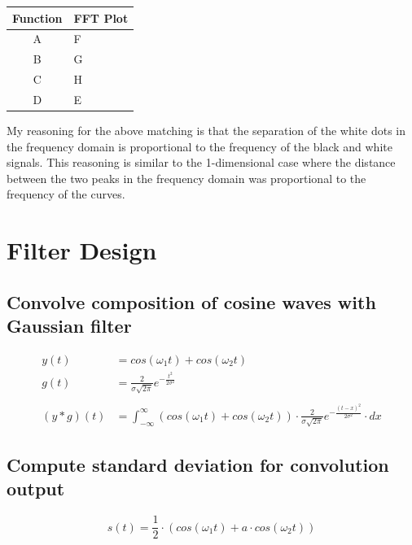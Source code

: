 \documentclass[12pt, oneside]{article}
\begin{document}
\begin{table}[H]
    \centering
    \begin{tabular}{|c|l|}
    \hline
    \multicolumn{1}{|l|}{\textbf{Function}} & \textbf{FFT Plot} \\ \hline
    A                                       & F                 \\ \hline
    B                                       & G                 \\ \hline
    C                                       & H                 \\ \hline
    D                                       & E                 \\ \hline
    \end{tabular}
\end{table}

My reasoning  for the above matching is that the separation of the white dots 
in the frequency domain is proportional to the frequency of the black and white
signals. This reasoning is similar to the 1-dimensional case where 
the distance between the two peaks in the frequency domain was 
proportional to the frequency of the curves.

\section{Filter Design}

\subsection{Convolve composition of cosine waves with Gaussian filter}

\begin{align*}
    y(t) &= cos(\omega_1 t) + cos(\omega_2 t) \\
    g(t) &= \frac{2}{\sigma \sqrt{2 \pi}}e^{-\frac{t^2}{2 \sigma ^ 2}}  \\\\
    (y * g)(t) &= 
    \int_{-\infty}^{\infty} 
    \left( cos(\omega_1 t) + cos(\omega_2 t) \right)
    \cdot
    \frac{2}{\sigma \sqrt{2 \pi}}e^{-\frac{(t-x)^2}{2 \sigma ^ 2}} \cdot dx  
\end{align*}

\subsection{Compute standard deviation for convolution output}

$$ s(t) = \frac{1}{2}\cdot (cos(\omega_1 t) + a \cdot cos(\omega_2 t)) $$
\end{document}
